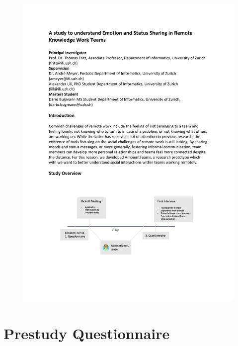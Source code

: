 \begin{figure}[h]
    \centering
    \includegraphics[width=\linewidth, page=4]{./documents/study_instructions.pdf}
\end{figure}

\chapter{Prestudy Questionnaire}
\label{chapter:prestudy_questionnaire}

